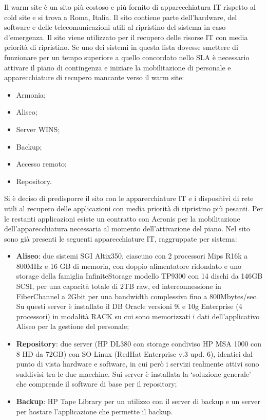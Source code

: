 \documentclass[12pt, a4paper, titlepage]{report}
\newcommand{\vendor}{Acronis} %
\begin{document}
	Il warm site è un sito più costoso e più fornito di apparecchiatura IT rispetto al cold site e si trova a Roma, Italia. Il sito contiene parte dell'hardware, del software e delle telecomunicazioni utili al ripristino del sistema in caso d'emergenza. Il sito viene utilizzato per il recupero delle risorse IT con media priorità di ripristino. Se uno dei sistemi in questa lista dovesse smettere di funzionare per un tempo superiore a quello concordato nello SLA è necessario attivare il piano di contingenza e iniziare la mobilitazione di personale e apparecchiature di recupero mancante verso il warm site:
	\begin{itemize}
		\item Armonia;
		\item Aliseo;
		\item Server WINS;
		\item Backup;
		\item Accesso remoto;
		\item Repository.
	\end{itemize}
	Si è deciso di predisporre il sito con le apparecchiature IT e i dispositivi di rete utili al recupero delle applicazioni con media priorità di ripristino più pesanti. Per le restanti applicazioni esiste un contratto con \vendor{} per la mobilitazione dell'apparecchiatura necessaria al momento dell'attivazione del piano.
	Nel sito sono già presenti le seguenti apparecchiature IT, raggruppate per sistema:
	\begin{itemize}
		\item \textbf{Aliseo}: due sistemi SGI Altix350, ciascuno con 2 processori Mips R16k a 800MHz e 16 GB di memoria, con doppio alimentatore ridondato e uno storage della famiglia InfiniteStorage modello TP9300 con 14 dischi da 146GB SCSI, per una capacità totale di 2TB raw, ed interconnessione in FiberChannel a 2Gbit per una bandwidth complessiva fino a 800Mbytes/sec. Su questi server è installato il DB Oracle versioni 9i e 10g Enterprise (4 processori) in modalità RACK su cui sono memorizzati i dati dell'applicativo Aliseo per la gestione del personale;
		\item \textbf{Repository}:  due server (HP DL380 con storage condiviso HP MSA 1000 con 8 HD da 72GB) con SO Linux (RedHat Enterprise v.3 upd. 6), identici dal punto di vista hardware e software, in cui però i servizi realmente attivi sono suddivisi tra le due macchine. Sui server è installata la `soluzione generale' che comprende il software di base per il repository;
		\item \textbf{Backup}: HP Tape Library per un utilizzo con il server di backup e un server per hostare l'applicazione che permette il backup.
	\end{itemize}
\end{document}
